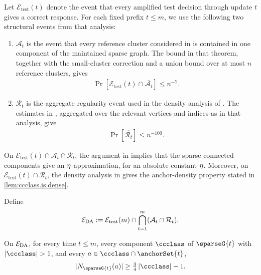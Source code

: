 Let $ \mathcal E_{\mathrm{test}}(t) $ denote the event that every amplified test decision through update $ t $ gives a correct response.
For each fixed prefix $ t\le m $, we use the following two structural events from that analysis:
\begin{enumerate}
    \item $ \mathcal A_t $ is the event that every reference cluster considered in \cite[Theorem~23]{CLMP2024Dynamic} is contained in one component of the maintained sparse graph.
    The bound in that theorem, together with the small-cluster correction and a union bound over at most $ n $ reference clusters, gives
    \begin{align}
        \Pr[
            \mathcal E_{\mathrm{test}}(t)
            \cap \overline{\mathcal A_t}
        ]
        \le n^{-7}.
    \end{align}

    \item $ \mathcal R_t $ is the aggregate regularity event used in the density analysis of \cite[Definition~28 and Observation~29]{CLMP2024Dynamic}.
    The estimates in \cite[Lemmas~25 and~27]{CLMP2024Dynamic}, aggregated over the relevant vertices and indices as in that analysis, give
    \begin{align}
        \Pr[\overline{\mathcal R_t}]
        \le n^{-100}.
    \end{align}
\end{enumerate}

On $ \mathcal E_{\mathrm{test}}(t)\cap\mathcal A_t\cap\mathcal R_t $, the argument in \cite[proof of Theorem~6]{CLMP2024Dynamic} implies that the sparse connected components give an $ \eta $-approximation, for an absolute constant $ \eta $.
Moreover, on $ \mathcal E_{\mathrm{test}}(t)\cap\mathcal R_t $, the density analysis in \cite[proof of Theorem~39]{CLMP2024Dynamic} gives the anchor-density property stated in \cref{lem:ccclass.is.dense}.

Define
\begin{align}
    \mathcal{E}_{\rm DA}
    :=
    \mathcal E_{\mathrm{test}}(m)
    \cap
    \bigcap_{t=1}^{m}
    (\mathcal A_t\cap\mathcal R_t).
\end{align}

\begin{lemma}
    \label{lem:ccclass.is.dense}
    On $ \mathcal{E}_{\rm DA} $, for every time $ t\le m $, every component $ \ccclass $ of $ \sparseG{t} $ with $ \card{\ccclass}>1 $, and every $ a\in \ccclass\cap\anchorSet{t} $,
    \begin{align}
        |\openN{\sparseG{t}}{a}|\ge\tfrac34\card{\ccclass}-1.
    \end{align}
\end{lemma}

